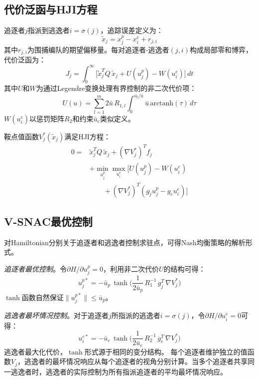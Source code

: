 \documentclass[conference]{IEEEtran}
\begin{document}
\subsection{代价泛函与HJI方程}

追逐者$j$指派到逃逸者$i = \sigma(j)$，追踪误差定义为：
\begin{equation}\label{eq:error}
\tilde{x}_j = x_j^p - x_i^e + r_{j,i}
\end{equation}
其中$r_{j,i}$为围捕编队的期望偏移量。每对追逐者-逃逸者$(j, i)$构成局部零和博弈，代价泛函为：
\begin{equation}\label{eq:cost}
J_j = \int_0^\infty \!\Big[\tilde{x}_j^T Q\,\tilde{x}_j + U(u_j^p) - W(u_i^e)\Big]\,dt
\end{equation}
其中$U$和$W$为通过Legendre变换处理有界控制的非二次代价项：
\begin{equation}\label{eq:nq}
U(u) = \sum_{l=1}^m 2\bar{u}\,R_{1,l}\int_0^{u_l/\bar{u}} \bar{u}\,\mathrm{arctanh}(\tau)\,d\tau
\end{equation}
$W(u_i^e)$以惩罚矩阵$R_2$和约束$\bar{u}_e$类似定义。

鞍点值函数$V_j^*(\tilde{x}_j)$满足HJI方程：
\begin{equation}\label{eq:hji}
\begin{split}
0 ={} & \tilde{x}_j^T Q\,\tilde{x}_j + (\nabla V_j^*)^T f_j \\
& + \min_{u_j^p}\max_{u_i^e} \Big[U(u_j^p) - W(u_i^e) \\
& \qquad + (\nabla V_j^*)^T (g_j u_j^p - g_e u_i^e)\Big]
\end{split}
\end{equation}

\subsection{V-SNAC最优控制}

对Hamiltonian分别关于追逐者和逃逸者控制求驻点，可得Nash均衡策略的解析形式。

\textit{追逐者最优控制}。令$\partial H/\partial u_j^p = 0$，利用非二次代价$U$的结构可得：
\begin{equation}\label{eq:ctrl_pursuer}
u_j^{p*} = -\bar{u}_p\,\tanh\!\bigg(\frac{1}{2\bar{u}_p}\,R_1^{-1}\,g_j^T\,\nabla V_j^*\bigg)
\end{equation}
$\tanh$函数自然保证$\|u_j^{p*}\| \leq \bar{u}_p$。

\textit{逃逸者最坏情况控制}。对于追逐者$j$所指派的逃逸者$i = \sigma(j)$，令$\partial H/\partial u_i^e = 0$可得：
\begin{equation}\label{eq:ctrl_evader}
u_i^{e*} = -\bar{u}_e\,\tanh\!\bigg(\frac{1}{2\bar{u}_e}\,R_2^{-1}\,g_e^T\,\nabla V_j^*\bigg)
\end{equation}
逃逸者最大化代价，$\tanh$形式源于相同的变分结构。
每个追逐者维护独立的值函数$V_j$，逃逸者的最坏情况响应从每个追逐者的视角分别计算。当多个追逐者共享同一逃逸者时，逃逸者的实际控制为所有指派追逐者的平均最坏情况响应。
\end{document}
